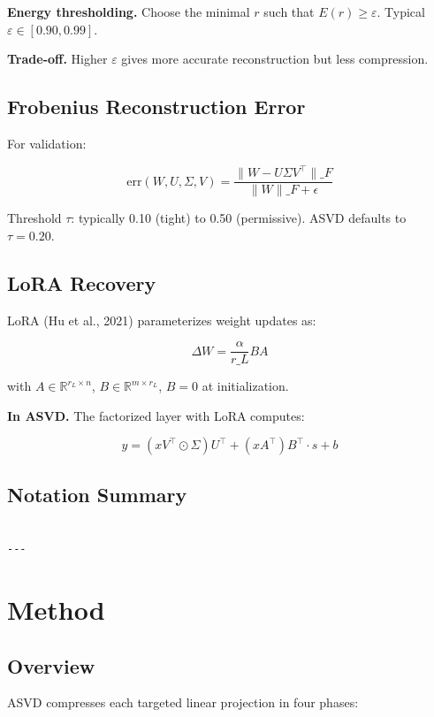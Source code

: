 \textbf{Energy thresholding.} Choose the minimal $r$ such that $E(r) \geq \varepsilon$. 
Typical $\varepsilon \in [0.90, 0.99]$.

\textbf{Trade-off.} Higher $\varepsilon$ gives more accurate reconstruction but 
less compression.

\subsection{Frobenius Reconstruction Error}

For validation:

\[
\text{err}(W, U, \Sigma, V) = \frac{\|W - U \Sigma V^\top\|\_F}{\|W\|\_F + \epsilon}
\]

Threshold $\tau$: typically 0.10 (tight) to 0.50 (permissive). ASVD 
defaults to $\tau = 0.20$.

\subsection{LoRA Recovery}

LoRA (Hu et al., 2021) parameterizes weight updates as:

\[
\Delta W = \frac{\alpha}{r\_L} B A
\]

with $A \in \mathbb{R}^{r_L \times n}$, $B \in \mathbb{R}^{m \times r_L}$, 
$B = 0$ at initialization.

\textbf{In ASVD.} The factorized layer with LoRA computes:

\[
y = (x V^\top \odot \Sigma) U^\top + (x A^\top) B^\top \cdot s + b
\]

\subsection{Notation Summary}

\begin{lstlisting}

---
\end{lstlisting}


\section{Method}

\subsection{Overview}

ASVD compresses each targeted linear projection in four phases:

